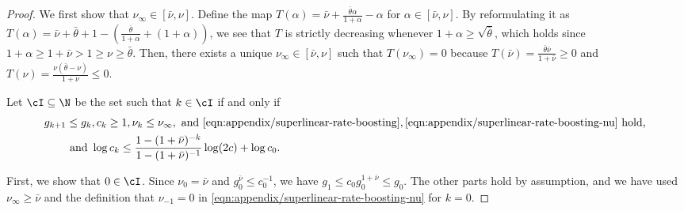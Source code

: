\begin{proof}
    We first show that $\nu_\infty \in [\bar \nu, \nu]$. 
    Define the map $T(\alpha) = \bar \nu + \frac{\bar \theta \alpha}{1 + \alpha} - \alpha$ for $\alpha \in [\bar\nu, \nu]$.
    By reformulating it as $T(\alpha) = \bar \nu + \bar \theta + 1 - \left( \frac{\bar \theta}{1 + \alpha} + (1 + \alpha) \right)$, 
    we see that $T$ is strictly decreasing whenever $1 + \alpha \geq \sqrt{\bar \theta}$,
    which holds since $1 + \alpha \geq 1 + \bar\nu > 1 \geq \nu \geq \bar \theta$.
    Then, there exists a unique $\nu_\infty \in [\bar\nu, \nu]$ such that $T(\nu_\infty) = 0$
    because $T(\bar\nu) = \frac{\bar\theta\bar\nu}{1 + \bar\nu} \geq 0$ and $T(\nu) = \frac{\nu(\bar\theta-\nu)}{1 + \nu} \leq 0$.

    Let $\cI \subseteq \N$ be the set such that $k \in \cI$ if and only if
    \begin{align*}
        g_{k+1} &\leq g_{k}, c_k \geq 1, \nu_k \leq  \nu_\infty,
        \text{ and }
        \eqref{eqn:appendix/superlinear-rate-boosting},
        \eqref{eqn:appendix/superlinear-rate-boosting-nu}
        \text{ hold, } \\
       & \text{ and }
        \log c_k 
        \leq \frac{1 - (1 + \bar\nu)^{-k}}{1 - (1 + \bar\nu)^{-1}} \log (2c) + \log c_0.
    \end{align*}

    First, we show that $0 \in \cI$.
    Since $\nu_0 = \bar \nu$ and $g_0^{\bar \nu} \leq c_0^{-1}$, 
    we have $g_1 \leq c_0g_0^{1 + \bar \nu} \leq g_0$.
    The other parts hold by assumption, and we have used $\nu_\infty \geq \bar \nu$ and the definition that $\nu_{-1} = 0$ in \eqref{eqn:appendix/superlinear-rate-boosting-nu} for $k = 0$.


\end{proof}
